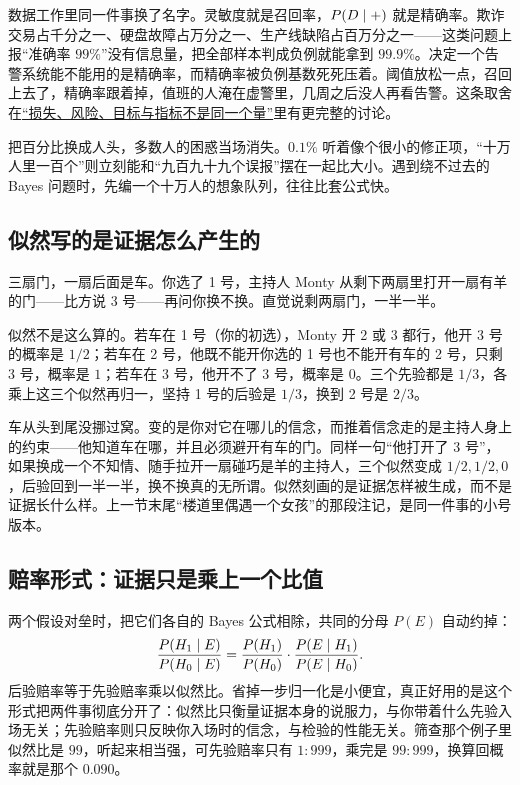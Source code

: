 数据工作里同一件事换了名字。灵敏度就是召回率，\(P(D\mid+)\) 就是精确率。欺诈交易占千分之一、硬盘故障占万分之一、生产线缺陷占百万分之一——这类问题上报``准确率 \(99\%\)''没有信息量，把全部样本判成负例就能拿到 \(99.9\%\)。决定一个告警系统能不能用的是精确率，而精确率被负例基数死死压着。阈值放松一点，召回上去了，精确率跟着掉，值班的人淹在虚警里，几周之后没人再看告警。这条取舍在\hyperref[sec:13-Machine-Learning/01-Learning-Problems-and-Evaluation/02]{``损失、风险、目标与指标不是同一个量''}里有更完整的讨论。

\begin{remark}
把百分比换成人头，多数人的困惑当场消失。\(0.1\%\) 听着像个很小的修正项，``十万人里一百个''则立刻能和``九百九十九个误报''摆在一起比大小。遇到绕不过去的 Bayes 问题时，先编一个十万人的想象队列，往往比套公式快。
\end{remark}

\subsection{似然写的是证据怎么产生的}

三扇门，一扇后面是车。你选了 1 号，主持人 Monty 从剩下两扇里打开一扇有羊的门——比方说 3 号——再问你换不换。直觉说剩两扇门，一半一半。

似然不是这么算的。若车在 1 号（你的初选），Monty 开 2 或 3 都行，他开 3 号的概率是 \(1/2\)；若车在 2 号，他既不能开你选的 1 号也不能开有车的 2 号，只剩 3 号，概率是 \(1\)；若车在 3 号，他开不了 3 号，概率是 \(0\)。三个先验都是 \(1/3\)，各乘上这三个似然再归一，坚持 1 号的后验是 \(1/3\)，换到 2 号是 \(2/3\)。

车从头到尾没挪过窝。变的是你对它在哪儿的信念，而推着信念走的是主持人身上的约束——他知道车在哪，并且必须避开有车的门。同样一句``他打开了 3 号''，如果换成一个不知情、随手拉开一扇碰巧是羊的主持人，三个似然变成 \(1/2,1/2,0\)，后验回到一半一半，换不换真的无所谓。似然刻画的是证据怎样被生成，而不是证据长什么样。上一节末尾``楼道里偶遇一个女孩''的那段注记，是同一件事的小号版本。

\subsection{赔率形式：证据只是乘上一个比值}

两个假设对垒时，把它们各自的 Bayes 公式相除，共同的分母 \(P(E)\) 自动约掉：
\[
\frac{P(H_1\mid E)}{P(H_0\mid E)}=\frac{P(H_1)}{P(H_0)}\cdot\frac{P(E\mid H_1)}{P(E\mid H_0)}.
\]
后验赔率等于先验赔率乘以似然比。省掉一步归一化是小便宜，真正好用的是这个形式把两件事彻底分开了：似然比只衡量证据本身的说服力，与你带着什么先验入场无关；先验赔率则只反映你入场时的信念，与检验的性能无关。筛查那个例子里似然比是 \(99\)，听起来相当强，可先验赔率只有 \(1:999\)，乘完是 \(99:999\)，换算回概率就是那个 \(0.090\)。

